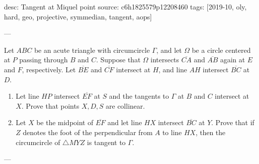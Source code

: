 desc: Tangent at Miquel point
source: c6h1825579p12208460
tags: [2019-10, oly, hard, geo, projective, symmedian, tangent, aops]

---

Let $ABC$ be an acute triangle with circumcircle $\Gamma$, and let $\Omega$ be a circle centered at $P$ passing through $B$ and $C$. Suppose that $\Omega$ intersects $\overline{CA}$ and $\overline{AB}$ again at $E$ and $F$, respectively. Let $\overline{BE}$ and $\overline{CF}$ intersect at $H$, and line $AH$ intersect $\overline{BC}$ at $D$.
\begin{enumerate}[label=(\alph*)]
    \item Let line $HP$ intersect $\overline{EF}$ at $S$ and the tangents to $\Gamma$ at $B$ and $C$ intersect at $X$. Prove that points $X,D,S$ are collinear.
    \item Let $X$ be the midpoint of $\overline{EF}$ and let line $HX$ intersect $\overline{BC}$ at $Y$. Prove that if $Z$ denotes the foot of the perpendicular from $A$ to line $HX$, then the circumcircle of $\triangle MYZ$ is tangent to $\Gamma$.
\end{enumerate}

---

